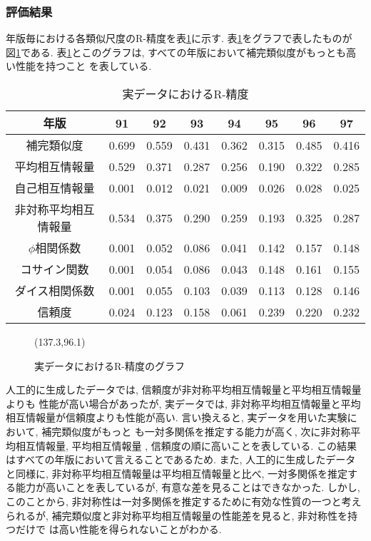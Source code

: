 \subsubsection{評価結果}
年版毎における各類似尺度のR-精度を表\ref{r_prec2}に示す. 
表\ref{r_prec2}をグラフで表したものが
図\ref{r_prec}である. 
表\ref{r_prec2}とこのグラフは, 
すべての年版において補完類似度がもっとも高い性能を持つこと
を表している. 
{\small 
\begin{table}[thbp]
\centering
\caption{実データにおけるR-精度}\label{r_prec2}
{\small
\begin{tabular}{|c||c|c|c|c|c|c|c|}
\hline
年版 & 91 & 92 & 93 & 94 & 95 & 96 & 97 \\ \hline \hline 
補完類似度 & 0.699 & 0.559 & 0.431 & 0.362 & 0.315 & 0.485 & 0.416 \\ \hline
平均相互情報量 & 0.529 & 0.371 & 0.287 & 0.256 & 0.190 & 0.322 & 0.285
 \\ \hline
自己相互情報量 & 0.001 & 0.012 & 0.021 & 0.009 & 0.026 & 0.028 & 0.025
 \\ \hline 
非対称平均相互情報量 & 0.534 & 0.375 & 0.290 & 0.259 & 0.193 & 0.325 & 0.287
 \\ \hline 
$\phi$相関係数 & 0.001 & 0.052 & 0.086 & 0.041 & 0.142 & 0.157 & 0.148
 \\ \hline 
コサイン関数 & 0.001 & 0.054 & 0.086 & 0.043 & 0.148 & 0.161 & 0.155 \\ \hline
ダイス相関係数 & 0.001 & 0.055 & 0.103 & 0.039 & 0.113 & 0.128 & 0.146
 \\ \hline 
信頼度 & 0.024 & 0.123 & 0.158 & 0.061 & 0.239 & 0.220 & 0.232 \\ \hline
\end{tabular}
}
\end{table}
}
\begin{figure}[bhtp]
\centering
\atari(137.3,96.1)
\caption{実データにおけるR-精度のグラフ} \label{r_prec}
\end{figure}
人工的に生成したデータでは, 信頼度が非対称平均相互情報量と平均相互情報量よりも
性能が高い場合があったが, 
実データでは, 非対称平均相互情報量と平均相互情報量が信頼度よりも性能が高い. 
言い換えると, 実データを用いた実験において, 補完類似度がもっと
も一対多関係を推定する能力が高く, 次に非対称平均相互情報量, 平均相互情報量
, 信頼度の順に高いことを表している. 
この結果はすべての年版において言えることであるため. 
また, 人工的に生成したデータと同様に, 非対称平均相互情報量は平均相互情報量と比べ, 
一対多関係を推定する能力が高いことを表しているが, 
有意な差を見ることはできなかった. 
しかし, このことから, 非対称性は一対多関係を推定するために有効な性質の一つと考え
られるが, 補完類似度と非対称平均相互情報量の性能差を見ると, 非対称性を持つだけで
は高い性能を得られないことがわかる. 

